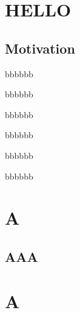 \documentclass[10pt]{book}
\begin{document}
    \chapter{HELLO}


    \section{Motivation}
    \lipsum
    \begin{theorem}
    \end{theorem}

    \begin{corollary}
    \end{corollary}

    \begin{proposition}
        bbbbbb
    \end{proposition}

    \begin{conjecture}
        bbbbbb
    \end{conjecture}

    \begin{lemma}
        bbbbbb
    \end{lemma}

    \begin{definition}
        bbbbbb
    \end{definition}

    \begin{remark}
        bbbbbb
    \end{remark}

    \begin{assumption}
        bbbbbb
    \end{assumption}






    \cleardoublepage%
    \appendix
    \pagestyle{back} %

\chapter{A}
\section{AAA}
\chapter{A}
\end{document}
